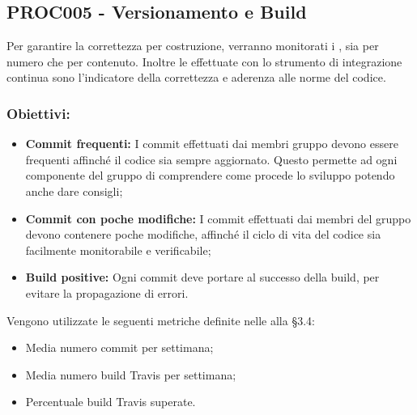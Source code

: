 \documentclass[PianoDiQualifica.tex]{subfiles}
\begin{document}
\subsection{PROC005 - Versionamento e Build}
Per garantire la correttezza per costruzione, verranno monitorati i , sia per numero che per contenuto. Inoltre le  effettuate con lo strumento di integrazione continua  sono l'indicatore della correttezza e aderenza alle norme del codice.
\subsubsection{Obiettivi:}
\begin{itemize}
	\item \textbf{Commit frequenti:} I commit effettuati dai membri gruppo devono essere frequenti affinché il codice sia sempre aggiornato.
	Questo permette ad ogni componente del gruppo di comprendere come procede lo sviluppo potendo anche dare consigli;
	\item \textbf{Commit con poche modifiche:} I commit effettuati dai membri del gruppo devono contenere poche modifiche, affinché il ciclo di vita del codice sia facilmente monitorabile e verificabile;
	\item \textbf{Build positive:} Ogni commit deve portare al successo della build, per evitare la propagazione di errori.
\end{itemize}
Vengono utilizzate le seguenti metriche definite nelle \ndp alla \S{3.4}:
\begin{itemize}
	\item {} Media numero commit per settimana;
	\item {} Media numero build Travis per settimana;
	\item {} Percentuale build Travis superate.
\end{itemize}
\end{document}
